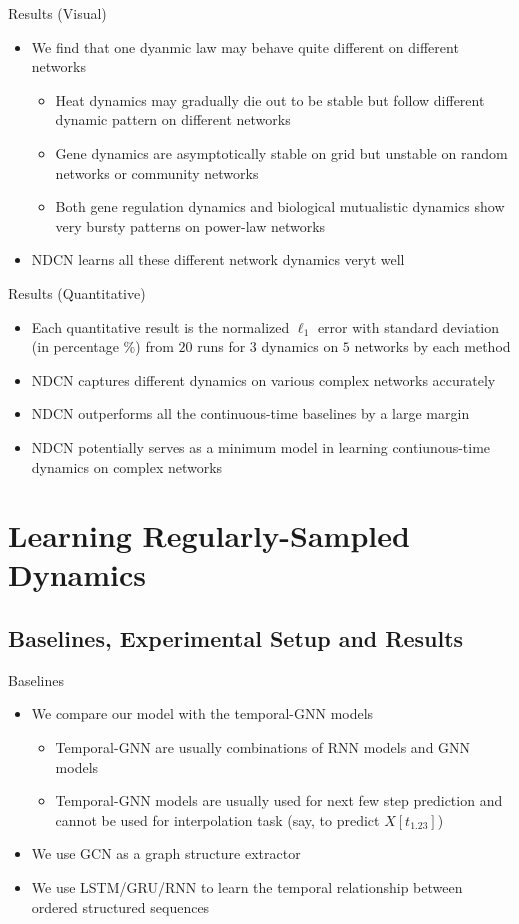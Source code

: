 \documentclass{beamer}
\begin{document}
\begin{frame}{Results (Visual)}
\begin{itemize}
\item We find that one dyanmic law may behave quite different on different networks
\begin{itemize}
\item Heat dynamics may gradually die out to be stable but follow different dynamic pattern on different networks
\item Gene dynamics are asymptotically stable on grid but unstable on random networks or community networks
\item Both gene regulation dynamics and biological mutualistic dynamics show very bursty patterns on power-law networks
\end{itemize}
\item NDCN learns all these different network dynamics veryt well
\end{itemize}
\end{frame}

\begin{frame}{Results (Quantitative)}
\begin{itemize}
\item Each quantitative result is the normalized $\ell_1$ error with standard deviation (in percentage \%) from $20$ runs for $3$ dynamics on $5$ networks by each method
\item NDCN captures different dynamics on various complex networks accurately
\item NDCN outperforms all the continuous-time baselines by a large margin
\item NDCN potentially serves as a minimum model in learning contiunous-time dynamics on complex networks
\end{itemize}
\end{frame}

\section{Learning Regularly-Sampled Dynamics}
\subsection{Baselines, Experimental Setup and Results}
\begin{frame}{Baselines}
\begin{itemize}
\item We compare our model with the temporal-GNN models
\begin{itemize}
\item Temporal-GNN are usually combinations of RNN models and GNN models
\item Temporal-GNN models are usually used for next few step prediction and cannot be used for interpolation task (say, to predict $X[t_{1.23}]$)
\end{itemize}
\item We use GCN as a graph structure extractor
\item We use LSTM/GRU/RNN to learn the temporal relationship between ordered structured sequences
\end{itemize}
\end{frame}
\end{document}
